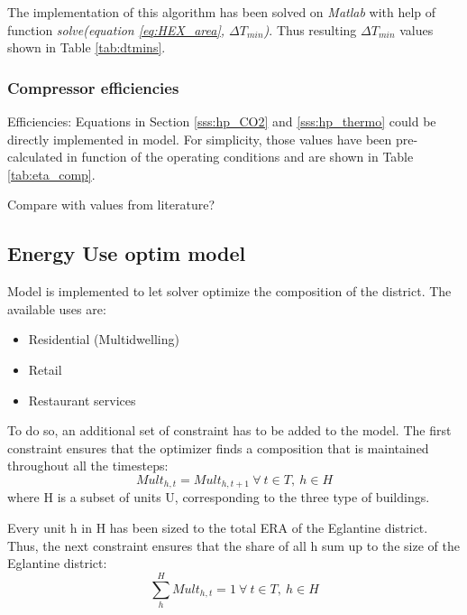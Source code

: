 \documentclass{article}
\begin{document}
The implementation of this algorithm has been solved on \textit{Matlab} with help of function \textit{solve(equation \ref{eq:HEX_area}, $\Delta T_{min}$)}.
Thus resulting $\Delta T_{min}$ values shown in Table \ref{tab:dtmins}.



\subsubsection{Compressor efficiencies}
Efficiencies: Equations in Section \ref{sss:hp_CO2} and \ref{sss:hp_thermo} could be directly implemented in model. For simplicity, those values have been pre-calculated in function of the operating conditions and are shown in Table \ref{tab:eta_comp}.



Compare with values from literature?\\




\subsection{Energy Use optim model}

Model is implemented to let solver optimize the composition of the district. The available uses are:
\begin{itemize}
	\item Residential (Multidwelling)
	\item Retail
	\item Restaurant services
\end{itemize}

To do so, an additional set of constraint has to be added to the model. The first constraint ensures that the optimizer finds a composition that is maintained throughout all the timesteps:
\begin{equation}
Mult_{h,t} = Mult_{h,t+1} \ \forall \ t \in T, \ h \in H
\end{equation}
where H is a subset of units U, corresponding to the three type of buildings.

Every unit h in H has been sized to the total ERA of the Eglantine district. Thus, the next constraint ensures that the share of all h sum up to the size of the Eglantine district:
\begin{equation}
\sum_{h}^{H} Mult_{h,t} = 1 \ \forall \ t \in T, \ h \in H
\end{equation}
\end{document}
